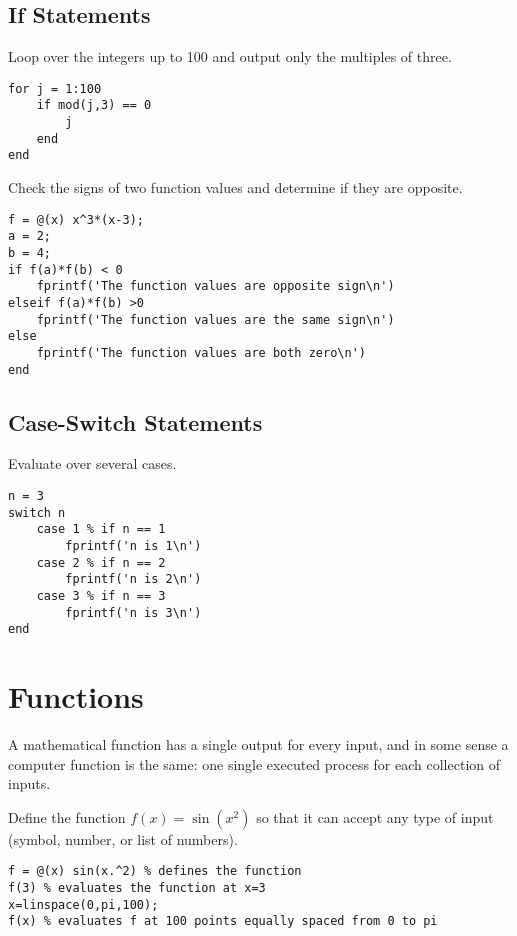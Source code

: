 \subsection{If Statements}
\begin{example}
    Loop over the integers up to 100 and output only the multiples of three.
\begin{lstlisting}
for j = 1:100
    if mod(j,3) == 0
        j
    end
end
\end{lstlisting}
\end{example}

\begin{example}
    Check the signs of two function values and determine if they are opposite.
\begin{lstlisting}
f = @(x) x^3*(x-3);
a = 2;
b = 4;
if f(a)*f(b) < 0
    fprintf('The function values are opposite sign\n')
elseif f(a)*f(b) >0
    fprintf('The function values are the same sign\n')
else
    fprintf('The function values are both zero\n')
end
\end{lstlisting}
\end{example}



\subsection{Case-Switch Statements}
\begin{example}
    Evaluate over several cases.
\begin{lstlisting}
n = 3
switch n
    case 1 % if n == 1
        fprintf('n is 1\n')
    case 2 % if n == 2
        fprintf('n is 2\n')
    case 3 % if n == 3
        fprintf('n is 3\n')
end
\end{lstlisting}
\end{example}

\section{Functions}
A mathematical function has a single output for every input, and in
some sense a computer function is the same: one single executed process for each
collection of inputs.  

\begin{example}
    Define the function $f(x) = \sin(x^2)$ so that it can accept any type of input
    (symbol, number, or list of numbers).
\begin{lstlisting}
f = @(x) sin(x.^2) % defines the function
f(3) % evaluates the function at x=3
x=linspace(0,pi,100);
f(x) % evaluates f at 100 points equally spaced from 0 to pi
\end{lstlisting}
\end{example}

